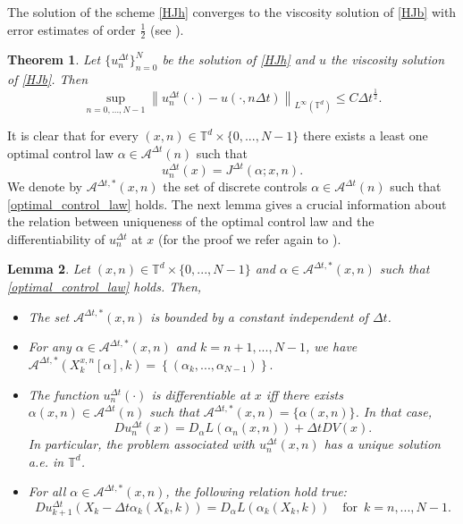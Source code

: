 \documentclass[11pt]{amsart}
\newtheorem{thm}{Theorem}[section]
\newtheorem{lemma}[thm]{Lemma}
\theoremstyle{remark}
\theoremstyle{definition}
\theoremstyle{Claim}
\newcommand{\T}{{\mathbb{T}}}
\newcommand{\mA}{\mathcal A}
\newcommand{\half}{\frac 1 2}
\theoremstyle{plain}
\newcommand{\dt}{{\Delta t}}
\begin{document}
The solution of the scheme \eqref{HJh} converges to the viscosity solution of \eqref{HJb}  with error estimates of order  $\half$ (see \cite{cdi,dfn}).
\begin{thm} 
	Let $\{u^\dt_n\}_{n=0}^N$ be the solution of \eqref{HJh} and   $u$   the viscosity solution of \eqref{HJb}. Then
	\begin{equation}\label{stima_Linfty_semilag}
		\sup_{n=0,\dots, N-1}\left\|u^\dt_n(\cdot) - u(\cdot,n\Delta t)\right\|_{L^\infty(\T^d)}\le C\dt^\half.
	\end{equation}
\end{thm}

It is clear that for every $(x,n) \in \T^{d}\times \{0,...,N-1\}$ there exists a least one optimal control law $\alpha\in \mA^\dt(n) $ such that
\begin{equation}	\label{optimal_control_law}           
	  u^\dt_n(x)=J^{\Delta t}(\alpha;x,n).
\end{equation} 
We denote by $\mA^{\dt,*}(x,n)$   the set of discrete controls $\alpha\in \mA^{\dt}(n)$ such that \eqref{optimal_control_law}  holds. The next lemma gives a crucial information about the relation between uniqueness of the optimal control law and the differentiability 
of $u^\dt_n$ at $x$ (for the proof we refer again to \cite[Lemma 3.3]{csl}).
\begin{lemma}\label{lemma:optimal_control}
Let $(x,n) \in \T^{d}\times \{0,...,N-1\}$ and $\alpha \in \mA^{\dt,*}(x,n)$ such that \eqref{optimal_control_law} holds. 
 Then, 
 \begin{itemize}
 	\item[(i)]
 		  The set $\mA^{\dt,*}(x,n) $  is bounded by a constant independent of $\dt$.
 \item[(ii)] For any  $\alpha \in \mA^{\dt,*}(x,n)$ and $k=n+1,..., N-1$, we have   $ \mA^{\dt,*}(X_{k}^{x,n}[\alpha],k)= \left\{ (\alpha_{k},..., \alpha_{N-1})\right\}.$
\item[(iii)] The function $u^\dt_n(\cdot)$ is differentiable at $x$  iff there exists $ {\alpha}(x,n) \in \mA^{\dt}(n)$ such that  $\mA^{\dt,*}(x,n)= \{ {\alpha}(x,n)\}$. In that case,
 	\begin{equation}\label{optimal_control_1}
 		D u^\dt_n(x)= D_\alpha L( {\alpha}_{n}(x,n))+ \dt DV(x).
 	\end{equation}
 	In particular, the problem associated with $u^\dt_n(x,n)$ has a unique solution a.e. in $\T^{d}$. 
\item[(iv)] For all $\alpha \in \mA^{\dt,*}(x,n)$,  the following relation hold true:
 	\begin{equation}\label{optimal_control_2}
 		Du^\dt_{k+1}(X_{k}-\dt\alpha_{k}(X_{k},k)) =D_\alpha L(\alpha_{k}(X_{k},k))   \quad \mbox{for } \, k=n,..., N-1.
 	\end{equation} 
 \end{itemize}

\end{lemma}
\end{document}
